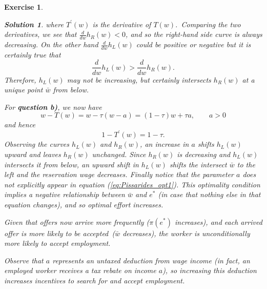 \documentclass[11pt]{article}
\newtheorem{exercise}[theorem]{Exercise}
\newtheorem{solution}[theorem]{Solution}
\begin{document}
\begin{exercise}
\begin{solution}
where \thinspace $T^{\prime }\left( w\right) $ is the derivative of $T\left(
w\right) $.\ Comparing the two derivatives, we see that $\frac{d}{dw}%
h_{R}\left( w\right) <0$, and so the right-hand side curve is always
decreasing. On the other hand $\frac{d}{dw}h_{L}\left( w\right) $ could be
positive or negative but it is certainly true that%
\begin{equation*}
\frac{d}{dw}h_{L}\left( w\right) >\frac{d}{dw}h_{R}\left( w\right) .
\end{equation*}%
Therefore, $h_{L}\left( w\right) $ may not be increasing, but certainly
intersects $h_{R}\left( w\right) $ at a unique point $\bar{w}$ from below.

For \textbf{question b)}, we now have%
\begin{equation*}
w-T\left( w\right) =w-\tau \left( w-a\right) =\left( 1-\tau \right) w+\tau
a,\qquad a>0
\end{equation*}%
and hence%
\begin{equation*}
1-T^{\prime }\left( w\right) =1-\tau .
\end{equation*}%
Observing the curves $h_{L}\left( w\right) $ and $h_{R}\left( w\right) $, an
increase in $a$ shifts $h_{L}\left( w\right) $ upward and leaves $%
h_{R}\left( w\right) $ unchanged. Since $h_{R}\left( w\right) $ is
decreasing and $h_{L}\left( w\right) $ intersects it from below, an upward
shift in $h_{L}\left( w\right) $ shifts the intersect $\bar{w}$ to the left
and the reservation wage decreases. Finally notice that the parameter $a$
does not explicitly appear in equation (\ref{eq:Pissarides_opt1}). This
optimality condition implies a negative relationship between $\bar{w}$ and $%
e^{\ast }$ (in case that nothing else in that equation changes), and so
optimal effort increases.

Given that offers now arrive more frequently ($\pi \left( e^{\ast }\right) $
increases), and each arrived offer is more likely to be accepted\ ($\bar{w}$
decreases), the worker is unconditionally more likely to accept employment.

Observe that $a$ represents an untaxed deduction from wage income (in fact,
an employed worker receives a tax rebate on income $a$), so increasing this
deduction increases incentives to search for and accept employment.


\end{solution}
\end{exercise}
\end{document}
